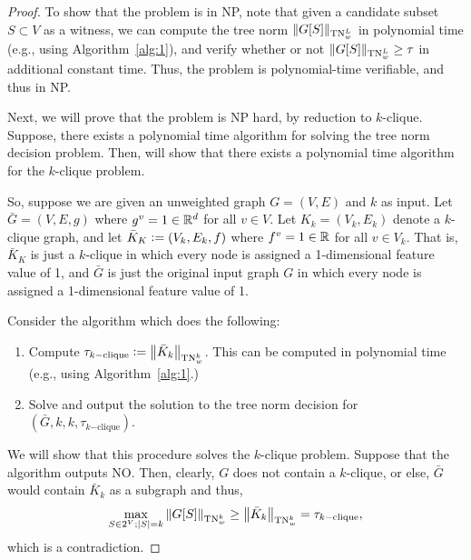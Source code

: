 \begin{proof} To show that the problem is in NP, note that given a candidate subset $S \subset V$ as a witness, we can compute the tree norm $\Vert G[S] \Vert_{\textnormal{TN}_w^L}$ in polynomial time (e.g., using Algorithm~\ref{alg:1}), and verify whether or not $\Vert G[S] \Vert_{\textnormal{TN}_w^L} \geq \tau$ in additional constant time. Thus, the problem is polynomial-time verifiable, and thus in NP. 

Next, we will prove that the problem is NP hard, by reduction to $k$-clique. Suppose, there exists a polynomial time algorithm for solving the tree norm decision problem. Then, will show that there exists a polynomial time algorithm for the $k$-clique problem. 

So, suppose we are given an unweighted graph $G = (V, E)$ and $k$ as input. Let $\bar{G} = (V, E, g)$ where $g^v = 1 \in \mathbb R^d$ for all $v \in V$. Let $K_k = (V_k, E_k)$ denote a $k$-clique graph, and let $\bar{K}_K \mathrel{\mathop:}= (V_k, E_k, f)$ where $f^v = 1 \in \mathbb R$ for all $v \in V_k$. That is, $\bar{K}_K$ is just a $k$-clique in which every node is assigned a 1-dimensional feature value of 1, and $\bar{G}$ is just the original input graph $G$ in which every node is assigned a 1-dimensional feature value of 1.

Consider the algorithm which does the following: 
\begin{enumerate}
    \item Compute $\tau_{k\mathrm{-clique}} \mathrel{\mathop:}= \left\lVert\bar{K}_k\right\rVert_{\mathrm{TN}_w^k}$. This can be computed in polynomial time (e.g., using Algorithm~\ref{alg:1}.)
    \item Solve and output the solution to the tree norm decision for $(\bar{G}, k, k, \tau_{k\mathrm{-clique}})$. 
\end{enumerate}

We will show that this procedure solves the $k$-clique problem. Suppose that the algorithm outputs NO. Then, clearly, $G$ does not contain a $k$-clique, or else, $\bar{G}$ would contain $\bar{K}_k$ as a subgraph and thus, 
\begin{align*}
    \max_{S \in 2^V; \left\lvert S\right\rvert = k} \left\lVert G[S]\right\rVert_{\mathrm{TN}_w^k} \geq \left\lVert\bar{K}_k\right\rVert_{\mathrm{TN}_w^k} = \tau_{k\mathrm{-clique}}, 
\end{align*}
which is a contradiction. 


\end{proof}
